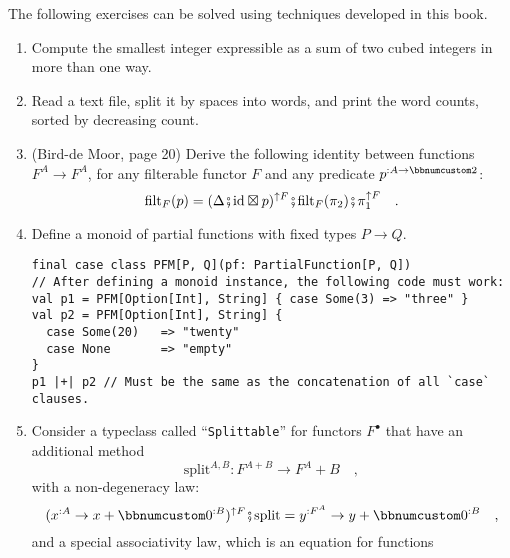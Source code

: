 The following exercises can be solved using techniques developed in
this book.
\begin{enumerate}
\item Compute the smallest integer expressible as a sum of two cubed integers
in more than one way.
\item Read a text file, split it by spaces into words, and print the word
counts, sorted by decreasing count.%
\begin{comment}
\begin{enumerate}
\item FPIS exercise 2.2: Check whether a sequence \lstinline!Seq[A]! is
sorted according to a given ordering function of type \lstinline!(A, A) => Boolean!.
\item FPIS exercise 3.24: Implement a function \lstinline!hasSubsequence!
that checks whether a \lstinline!List! contains another \lstinline!List!
as a subsequence. For instance, \lstinline!List(1,2,3,4)! would have
\lstinline!List(1,2)!, \lstinline!List(2,3)!, and \lstinline!List(4)!
as subsequences, among others. (Dynamic programming?)
\end{enumerate}
\end{comment}
\item (Bird-de Moor, page 20) Derive the following identity between functions
$F^{A}\rightarrow F^{A}$, for any filterable functor $F$ and any
predicate $p^{:A\rightarrow\bbnum 2}$: 
\[
\text{filt}_{F}(p)=(\Delta\bef\text{id}\boxtimes p)^{\uparrow F}\bef\text{filt}_{F}(\pi_{2})\bef\pi_{1}^{\uparrow F}\quad.
\]
\item Define a monoid of partial functions with fixed types $P\rightarrow Q$.
\begin{lstlisting}
final case class PFM[P, Q](pf: PartialFunction[P, Q])
// After defining a monoid instance, the following code must work:
val p1 = PFM[Option[Int], String] { case Some(3) => "three" }
val p2 = PFM[Option[Int], String] {
  case Some(20)   => "twenty"
  case None       => "empty"
}
p1 |+| p2 // Must be the same as the concatenation of all `case` clauses.
\end{lstlisting}
\item Consider a typeclass called \textsf{``}\lstinline!Splittable!\textsf{''} for functors
$F^{\bullet}$ that have an additional method 
\[
\text{split}^{A,B}:F^{A+B}\rightarrow F^{A}+B\quad,
\]
with a non-degeneracy law:
\[
(x^{:A}\rightarrow x+\bbnum 0^{:B})^{\uparrow F}\bef\text{split}=y^{:F^{A}}\rightarrow y+\bbnum 0^{:B}\quad,
\]
and a special associativity law, which is an equation for functions

\end{enumerate}
